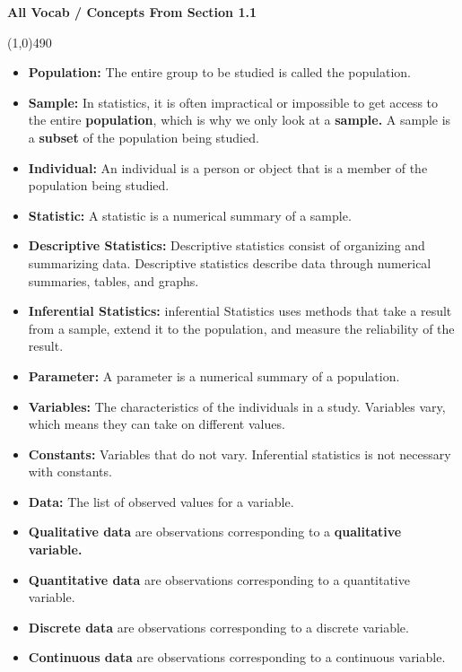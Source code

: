 \documentclass{report}
\begin{document}
        \pagebreak \bigbreak \noindent
        \begin{center}
            \begin{large}
                \textbf{All Vocab / Concepts From Section 1.1}
            \end{large}
        \end{center}
        \line(1,0){490}
        \begin{itemize}
            \item \textbf{Population:} The entire group to be studied is called the population.
            \item \textbf{Sample:} In statistics, it is often impractical or impossible to get access to the entire \textbf{population}, which is why we only look at a \textbf{sample.} A sample is a \textbf{subset} of the population being studied.
            \item \textbf{Individual:} An individual is a person or object that is a member of the population being studied.
            \item \textbf{Statistic:} A statistic is a numerical summary of a sample.
            \item \textbf{Descriptive Statistics:} Descriptive statistics consist of organizing and summarizing data. Descriptive statistics describe data through numerical summaries, tables, and graphs.
            \item \textbf{Inferential Statistics:} inferential Statistics uses methods that take a result from a sample, extend it to the population, and measure the reliability of the result.
            \item \textbf{Parameter:} A parameter is a numerical summary of a population.
            \item \textbf{Variables:} The characteristics of the individuals in a study. Variables vary, which means they can take on different values.
            \item \textbf{Constants:} Variables that do not vary. Inferential statistics is not necessary with constants.
            \item \textbf{Data:} The list of observed values for a variable.
            \item \textbf{Qualitative data} are observations corresponding to a \textbf{qualitative variable.}
            \item \textbf{Quantitative data} are observations corresponding to a quantitative variable.
            \item \textbf{Discrete data} are observations corresponding to a discrete variable.
            \item \textbf{Continuous data} are observations corresponding to a continuous variable.
        \end{itemize}
\end{document}
